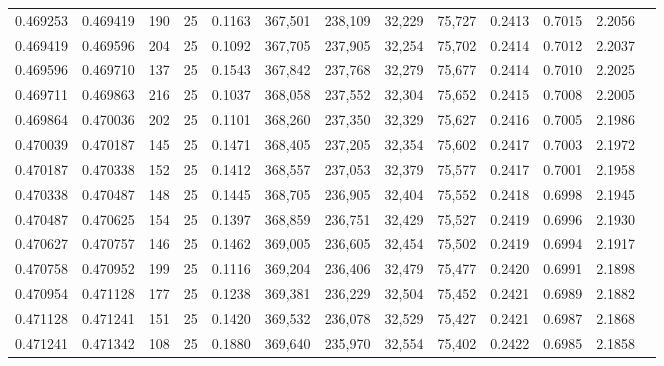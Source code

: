 \begin{tabular}{rrrrrrrrrrrrr}
0.469253 & 0.469419 &   190 &  25 &                                     0.1163 & 367,501 & 238,109 &  32,229 &  75,727 & 0.2413 & 0.7015 & 2.2056 \\
0.469419 & 0.469596 &   204 &  25 &                                     0.1092 & 367,705 & 237,905 &  32,254 &  75,702 & 0.2414 & 0.7012 & 2.2037 \\
0.469596 & 0.469710 &   137 &  25 &                                     0.1543 & 367,842 & 237,768 &  32,279 &  75,677 & 0.2414 & 0.7010 & 2.2025 \\
0.469711 & 0.469863 &   216 &  25 &                                     0.1037 & 368,058 & 237,552 &  32,304 &  75,652 & 0.2415 & 0.7008 & 2.2005 \\
0.469864 & 0.470036 &   202 &  25 &                                     0.1101 & 368,260 & 237,350 &  32,329 &  75,627 & 0.2416 & 0.7005 & 2.1986 \\
0.470039 & 0.470187 &   145 &  25 &                                     0.1471 & 368,405 & 237,205 &  32,354 &  75,602 & 0.2417 & 0.7003 & 2.1972 \\
0.470187 & 0.470338 &   152 &  25 &                                     0.1412 & 368,557 & 237,053 &  32,379 &  75,577 & 0.2417 & 0.7001 & 2.1958 \\
0.470338 & 0.470487 &   148 &  25 &                                     0.1445 & 368,705 & 236,905 &  32,404 &  75,552 & 0.2418 & 0.6998 & 2.1945 \\
0.470487 & 0.470625 &   154 &  25 &                                     0.1397 & 368,859 & 236,751 &  32,429 &  75,527 & 0.2419 & 0.6996 & 2.1930 \\
0.470627 & 0.470757 &   146 &  25 &                                     0.1462 & 369,005 & 236,605 &  32,454 &  75,502 & 0.2419 & 0.6994 & 2.1917 \\
0.470758 & 0.470952 &   199 &  25 &                                     0.1116 & 369,204 & 236,406 &  32,479 &  75,477 & 0.2420 & 0.6991 & 2.1898 \\
0.470954 & 0.471128 &   177 &  25 &                                     0.1238 & 369,381 & 236,229 &  32,504 &  75,452 & 0.2421 & 0.6989 & 2.1882 \\
0.471128 & 0.471241 &   151 &  25 &                                     0.1420 & 369,532 & 236,078 &  32,529 &  75,427 & 0.2421 & 0.6987 & 2.1868 \\
0.471241 & 0.471342 &   108 &  25 &                                     0.1880 & 369,640 & 235,970 &  32,554 &  75,402 & 0.2422 & 0.6985 & 2.1858 \\

\end{tabular}
